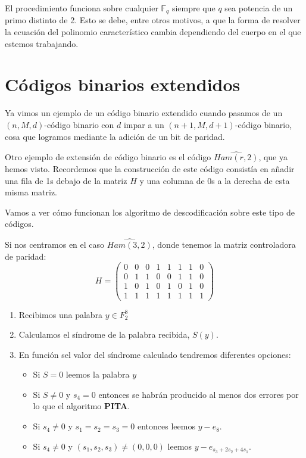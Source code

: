 \obs El procedimiento funciona sobre cualquier $\mathbb{F}_q$ siempre que $q$ sea potencia de un primo distinto de 2. Esto se debe, entre otros motivos, a que la forma de resolver la ecuación del polinomio característico cambia dependiendo del cuerpo en el que estemos trabajando.

\section{Códigos binarios extendidos}
Ya vimos un ejemplo de un código binario extendido cuando pasamos de un $(n,M,d)$-código binario con $d$ impar a un $(n+1,M,d+1)$-código binario, cosa que logramos mediante la adición de un bit de paridad.

Otro ejemplo de extensión de código binario es el código $\widehat{Ham(r,2)}$, que ya hemos visto. Recordemos que la construcción de este código consistía en añadir una fila de 1s debajo de la matriz $H$ y una columna de 0s a la derecha de esta misma matriz.

Vamos a ver cómo funcionan los algoritmo de descodificación sobre este tipo de códigos.

Si nos centramos en el caso $\widehat{Ham(3,2)}$, donde tenemos la matriz controladora de paridad:
\[H=\left( \begin{array}{cccccccc}
0 & 0 & 0 & 1 & 1 & 1 & 1 & 0 \\
0 & 1 & 1 & 0 & 0 & 1 & 1 & 0 \\
1 & 0 & 1 & 0 & 1 & 0 & 1 & 0 \\
1 & 1 & 1 & 1 & 1 & 1 & 1 & 1
\end{array}\right)\]

\begin{enumerate}
\item Recibimos una palabra $y\in F_2^8$
\item Calculamos el síndrome de la palabra recibida, $S(y)$.
\item En función sel valor del síndrome calculado tendremos diferentes opciones:
\begin{itemize}
\item Si $S=0$ leemos la palabra $y$
\item Si $S\neq 0$ y $s_4=0$ entonces se habrán producido al menos dos errores por lo que el algoritmo \textbf{PITA}.
\item Si $s_4\neq 0$ y $s_1=s_2=s_3=0$ entonces leemos $y-e_8$.
\item Si $s_4\neq 0$ y $(s_1,s_2,s_3)\neq (0,0,0)$ leemos $y-e_{s_3+2s_2+4s_1}$.
\end{itemize}
\end{enumerate}

